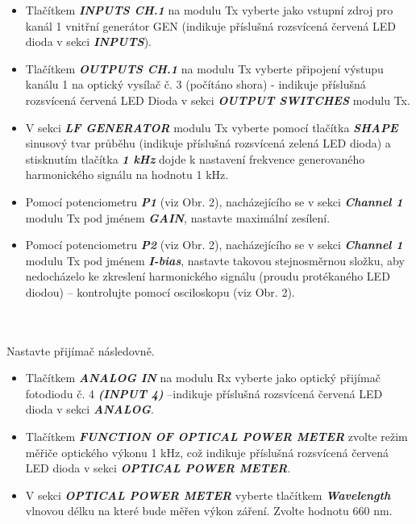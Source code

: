 \begin{itemize}
    \item Tlačítkem \textbf{\textit{INPUTS CH.1}} na modulu Tx vyberte jako vstupní zdroj pro kanál 1 vnitřní generátor GEN (indikuje příslušná rozsvícená červená LED dioda v sekci \textbf{\textit{INPUTS}}).
    \item Tlačítkem \textbf{\textit{OUTPUTS CH.1}} na modulu Tx vyberte připojení výstupu kanálu 1 na optický vysílač č. 3 (počítáno shora) - indikuje příslušná rozsvícená červená LED Dioda v sekci \textbf{\textit{OUTPUT SWITCHES}} modulu Tx.
    \item V sekci \textbf{\textit{LF GENERATOR}} modulu Tx vyberte pomocí tlačítka \textbf{\textit{SHAPE}} sinusový tvar průběhu (indikuje příslušná rozsvícená zelená LED dioda) a stisknutím tlačítka \textbf{\textit{1 kHz}} dojde k nastavení frekvence generovaného harmonického signálu na hodnotu 1 kHz.
    \item Pomocí potenciometru \textbf{\textit{P1}} (viz Obr. 2), nacházejícího se v sekci \textbf{\textit{Channel 1}} modulu Tx pod jménem \textbf{\textit{GAIN}}, nastavte maximální zesílení.
    \item Pomocí potenciometru \textbf{\textit{P2}} (viz Obr. 2), nacházejícího se v sekci \textbf{\textit{Channel 1}} modulu Tx pod jménem \textbf{\textit{I-bias}}, nastavte takovou stejnosměrnou složku, aby nedocházelo ke zkreslení harmonického signálu (proudu protékaného LED diodou) – kontrolujte pomocí osciloskopu (viz Obr. 2).
\end{itemize}
\\\\
Nastavte přijímač následovně.
\begin{itemize}
\item Tlačítkem \textbf{\textit{ANALOG IN}} na modulu Rx vyberte jako optický přijímač fotodiodu č. 4 \textbf{\textit{(INPUT 4)}} –indikuje příslušná rozsvícená červená LED dioda v sekci \textbf{\textit{ANALOG}}.
\item Tlačítkem \textbf{\textit{FUNCTION OF OPTICAL POWER METER}} zvolte režim měřiče optického výkonu 1 kHz, což indikuje příslušná rozsvícená červená LED dioda v sekci \textbf{\textit{OPTICAL POWER METER}}.
\item V sekci \textbf{\textit{OPTICAL POWER METER}} vyberte tlačítkem \textbf{\textit{Wavelength}} vlnovou délku na které bude měřen výkon záření. Zvolte hodnotu 660 nm.
\end{itemize}
\\\\
